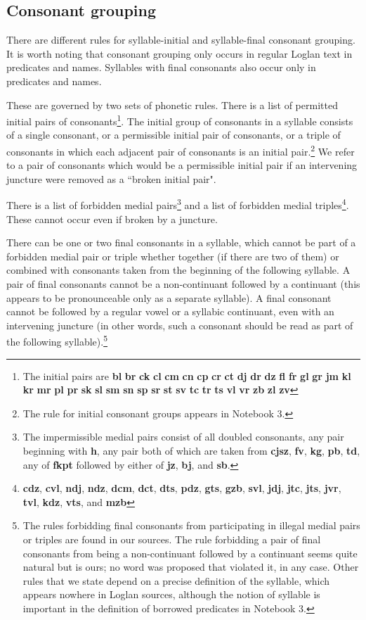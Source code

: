 \documentclass[12pt]{book}
\begin{document}
\subsection{Consonant grouping}

There are different rules for syllable-initial and syllable-final consonant grouping.  It is worth noting that consonant grouping only occurs in regular Loglan text in predicates and names.   Syllables with final consonants also occur only in predicates and names.

These are governed by two sets of phonetic rules.  There is a list of permitted initial pairs of consonants\footnote{The initial pairs are {\bf bl}  {\bf br}  {\bf ck}  {\bf cl}  {\bf cm}  {\bf cn}   {\bf cp}  {\bf cr}   {\bf ct}   {\bf dj}   {\bf dr}   {\bf dz}  {\bf fl}  {\bf fr}   {\bf gl}   {\bf gr}   {\bf jm}   {\bf kl}  {\bf kr}   {\bf mr}   {\bf pl}  {\bf pr}   {\bf sk}  {\bf sl}   {\bf sm}  {\bf sn}  {\bf sp}   {\bf sr}  {\bf st}  {\bf sv} {\bf tc}  {\bf tr}  {\bf ts}  {\bf vl}  {\bf vr} {\bf  zb}  {\bf  zl}  {\bf zv}}.  The initial group of consonants in a syllable consists of a single consonant, or a permissible initial pair of consonants, or a triple of consonants in which each adjacent pair of consonants is an initial pair.\footnote{The rule for initial consonant groups appears in Notebook 3.}  We refer to a pair of consonants which would be a permissible initial pair if an intervening juncture were removed as a ``broken initial pair".

There is a list of forbidden medial pairs\footnote{The impermissible medial pairs consist of all doubled consonants, any pair beginning with {\bf h}, any pair both of which are taken from {\bf cjsz}, {\bf fv}, {\bf kg}, {\bf pb}, {\bf td}, any of {\bf fkpt} followed by either of {\bf jz}, {\bf bj}, and {\bf sb}.}
and a list of forbidden medial triples\footnote{{\bf cdz}, {\bf cvl}, {\bf ndj}, {\bf ndz}, {\bf dcm}, {\bf dct}, {\bf dts}, {\bf pdz}, {\bf gts}, {\bf gzb}, {\bf svl}, {\bf jdj}, {\bf jtc}, {\bf jts}, {\bf jvr}, {\bf tvl}, {\bf kdz}, {\bf vts}, and {\bf mzb}}. 
 These cannot occur even if broken by a juncture.  

There can be one or two final consonants in
a syllable, which cannot be part of a forbidden medial pair or triple whether together (if there are two of them) or combined with consonants taken from the beginning of the following syllable.  A pair of final consonants cannot be a non-continuant followed by a continuant (this appears to be pronounceable only as a separate syllable).  A final consonant cannot be followed by a regular vowel or a syllabic continuant, even with an intervening juncture (in other words, such a consonant should be read as part of the following syllable).\footnote{The rules forbidding final consonants from participating in illegal medial pairs or triples are found in our sources.  The rule forbidding a pair of final consonants from being a non-continuant followed by a continuant seems quite natural but is ours;  no word was proposed that violated it, in any case.  Other rules that we state depend on a precise definition of the syllable, which appears nowhere in Loglan sources, although the notion of syllable is important in the definition of borrowed predicates in Notebook 3.}
\end{document}
